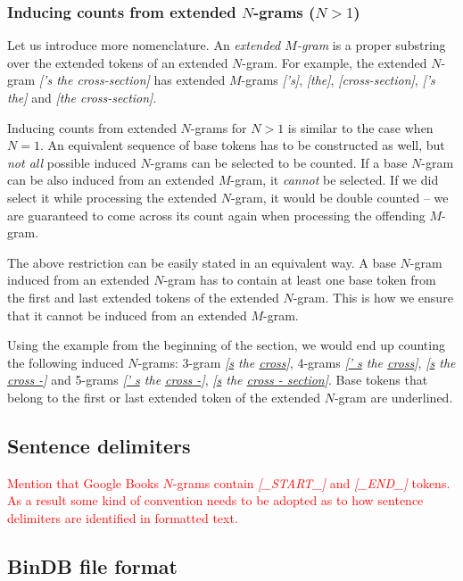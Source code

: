 \documentclass[draft]{IIBproject}
\DeclareRobustCommand{\noteSelf}[1]{\textcolor{red}{#1}}
\DeclareRobustCommand{\ngram}[1]{\emph{[#1]}}
\begin{document}
\subsubsection{Inducing counts from extended $N$-grams ($N > 1$)}

Let us introduce more nomenclature. An \emph{extended $M$-gram} is a proper substring over the extended tokens of an extended $N$-gram. For example, the extended $N$-gram \ngram{'s the \mbox{cross-section}} has extended $M$-grams \ngram{'s}, \ngram{the}, \ngram{\mbox{cross-section}}, \ngram{'s the} and \ngram{the \mbox{cross-section}}.

Inducing counts from extended $N$-grams for $N>1$ is similar to the case when $N=1$. An equivalent sequence of base tokens has to be constructed as well, but \emph{not all} possible induced $N$-grams can be selected to be counted. If a base $N$-gram can be also induced from an extended $M$-gram, it \emph{cannot} be selected. If we did select it while processing the extended $N$-gram, it would be double counted -- we are guaranteed to come across its count again when processing the offending $M$-gram.

The above restriction can be easily stated in an equivalent way. A base $N$-gram induced from an extended $N$-gram has to contain at least one base token from the first and last extended tokens of the extended $N$-gram. This is how we ensure that it cannot be induced from an extended $M$-gram.

Using the example from the beginning of the section, we would end up counting the following induced $N$-grams: 3-gram \ngram{\underline{s} the \underline{cross}}, 4-grams \ngram{\underline{' s} the \underline{cross}}, \ngram{\underline{s} the \underline{cross -}} and 5-grams \ngram{\underline{' s} the \underline{cross -}}, \ngram{\underline{s} the \underline{cross - section}}. Base tokens that belong to the first or last extended token of the extended $N$-gram are underlined.

\subsection{Sentence delimiters}

\noteSelf{Mention that Google Books $N$-grams contain \ngram{\_START\_} and \ngram{\_END\_} tokens. As a result some kind of convention needs to be adopted as to how sentence delimiters are identified in formatted text.}

\subsection{BinDB file format}
\end{document}
